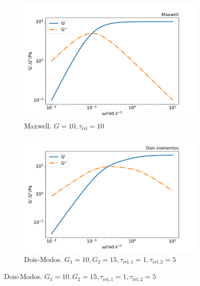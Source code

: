 			\begin{figure}[h]
				\begin{subfigure}[t]{.5\textwidth}
					\centering
					\includegraphics[width=\textwidth]{./imagens/reologia/modelos_comparativo_max}
					\caption{Maxwell. \(G=10, \tau_{\mathrm{rel}}=10\)}
					\label{fig:comparativo_modelo_maxwell}
				\end{subfigure}%
				\begin{subfigure}[t]{.5\textwidth}
					\centering
					\includegraphics[width=\textwidth]{./imagens/reologia/modelos_comparativo_doismodos}
					\caption{Dois-Modos. \(G_1=10, G_2=15, \tau_{\mathrm{rel,1}}=1,  \tau_{\mathrm{rel,2}}=5\)}
					\label{fig:comparativo_modelo_doismodos}
				\end{subfigure}
			

\end{figure}
